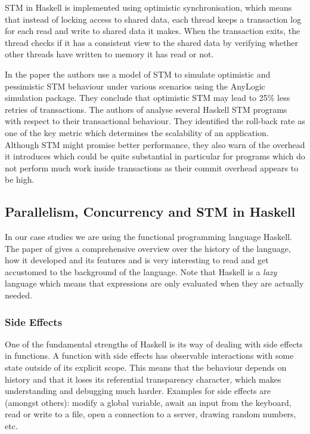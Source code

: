 STM in Haskell is implemented using optimistic synchronisation, which means that instead of locking access to shared data, each thread keeps a transaction log for each read and write to shared data it makes. When the transaction exits, the thread checks if it has a consistent view to the shared data by verifying whether other threads have written to memory it has read or not. %

In the paper \cite{heindl_modeling_2009} the authors use a model of STM to simulate optimistic and pessimistic STM behaviour under various scenarios using the AnyLogic simulation package. They conclude that optimistic STM may lead to 25\% less retries of transactions. The authors of \cite{perfumo_limits_2008} analyse several Haskell STM programs with respect to their transactional behaviour. They identified the roll-back rate as one of the key metric which determines the scalability of an application. Although STM might promise better performance, they also warn of the overhead it introduces which could be quite substantial in particular for programs which do not perform much work inside transactions as their commit overhead appears to be high.

\subsection{Parallelism, Concurrency and STM in Haskell}
In our case studies we are using the functional programming language Haskell. The paper of \cite{hudak_history_2007} gives a comprehensive overview over the history of the language, how it developed and its features and is very interesting to read and get accustomed to the background of the language. Note that Haskell is a \textit{lazy} language which means that expressions are only evaluated when they are actually needed.

\subsubsection{Side Effects}
One of the fundamental strengths of Haskell is its way of dealing with side effects in functions. A function with side effects has observable interactions with some state outside of its explicit scope. This means that the behaviour depends on history and that it loses its referential transparency character, which makes understanding and debugging much harder. Examples for side effects are (amongst others): modify a global variable, await an input from the keyboard, read or write to a file, open a connection to a server, drawing random numbers, etc.

